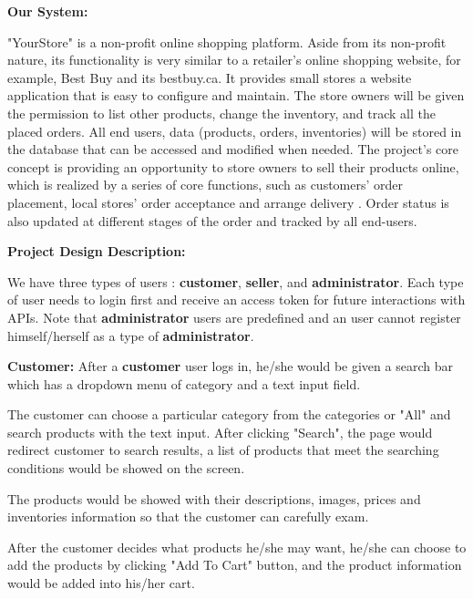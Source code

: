 \documentclass[12pt]{article}
\begin{document}
\vspace*{10mm}

\textbf{Our System:}
\vspace*{5mm}

"YourStore" is a non-profit online shopping platform. Aside from its non-profit nature, its functionality is very similar to a retailer’s online shopping website, for example, Best Buy and its bestbuy.ca. It provides small stores a website 
application that is easy to configure and maintain. The store owners will be given the permission to list other products, change the inventory, and track all the placed orders. All end users, data (products, orders, inventories) will be stored 
in the database that can be accessed and modified when needed. The project’s core concept is providing an opportunity to store owners to sell their products online, which is realized by a series of core functions, such as customers' order placement, local stores' 
order acceptance and arrange delivery . Order status is also updated at different stages of the order and tracked by all end-users.

\newpage 
\textbf{Project Design Description:}

We have three types of users : \textbf{customer}, \textbf{seller}, and \textbf{administrator}. Each type of user needs to 
login first and receive an access token for future interactions with APIs. Note that \textbf{administrator} users 
are predefined and an user cannot register himself/herself as a type of \textbf{administrator}.
\vspace*{5mm}

\textbf{Customer:}
    After a \textbf{customer} user logs in, he/she would be given a search bar which has a dropdown menu of category and a text input 
    field. 
    
    The customer can choose a particular category from the categories or "All" and search products with the text input. After clicking "Search",
    the page would redirect customer to search results, a list of products that meet the searching conditions would be showed on the screen.
    
    The products would be showed with their descriptions, images, prices and inventories information so that the customer can carefully exam.
    
    After the customer decides what products he/she may want, he/she can choose to add the products by clicking "Add To Cart" button, and the product information 
    would be added into his/her cart. 
    
\end{document}
